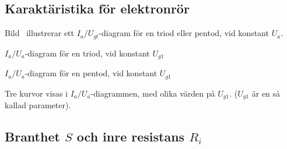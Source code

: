 \subsection{Karaktäristika för elektronrör}

Bild~ illustrerar ett \(I_a/U_{gt}\)-diagram för en triod
eller pentod, vid konstant \(U_a\).

\(I_a/U_a\)-diagram för en triod, vid konstant \(U_{g1}\)

\(I_a/U_a\)-diagram för en pentod, vid konstant \(U_{g1}\)

Tre kurvor visas i \(I_a/U_a\)-diagrammen, med olika värden på
\(U_{g1}\). (\(U_{g1}\) är en så kallad parameter).

\newpage
{}

\subsection{Branthet $S$ och inre resistans $R_i$}

